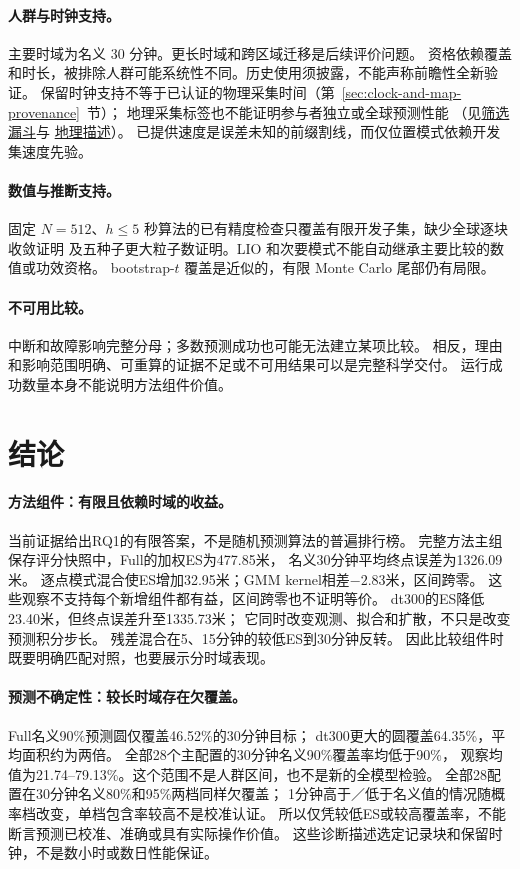 \documentclass[UTF8,11pt]{ctexart}
\begin{document}
\paragraph{人群与时钟支持。}
主要时域为名义 30 分钟。更长时域和跨区域迁移是后续评价问题。
资格依赖覆盖和时长，被排除人群可能系统性不同。历史使用须披露，不能声称前瞻性全新验证。
保留时钟支持不等于已认证的物理采集时间（第~\ref{sec:clock-and-map-provenance}~节）；
地理采集标签也不能证明参与者独立或全球预测性能
（见\hyperref[sec:final-cohort-funnel]{筛选漏斗}与
\hyperref[sec:final-cohort-geography]{地理描述}）。
已提供速度是误差未知的前缀割线，而仅位置模式依赖开发集速度先验。

\paragraph{数值与推断支持。}
固定 \(N=512\)、\(h\le5\) 秒算法的已有精度检查只覆盖有限开发子集，缺少全球逐块收敛证明
及五种子更大粒子数证明。LIO 和次要模式不能自动继承主要比较的数值或功效资格。
bootstrap-\(t\) 覆盖是近似的，有限 Monte Carlo 尾部仍有局限。

\paragraph{不可用比较。}
中断和故障影响完整分母；多数预测成功也可能无法建立某项比较。
相反，理由和影响范围明确、可重算的证据不足或不可用结果可以是完整科学交付。
运行成功数量本身不能说明方法组件价值。

\section{结论}
\paragraph{方法组件：有限且依赖时域的收益。}
当前证据给出RQ1的有限答案，不是随机预测算法的普遍排行榜。
完整方法主组保存评分快照中，Full的加权ES为477.85米，
名义30分钟平均终点误差为1326.09米。
逐点模式混合使ES增加32.95米；GMM kernel相差$-2.83$米，区间跨零。
这些观察不支持每个新增组件都有益，区间跨零也不证明等价。
dt300的ES降低23.40米，但终点误差升至1335.73米；
它同时改变观测、拟合和扩散，不只是改变预测积分步长。
残差混合在5、15分钟的较低ES到30分钟反转。
因此比较组件时既要明确匹配对照，也要展示分时域表现。

\paragraph{预测不确定性：较长时域存在欠覆盖。}
Full名义90\%预测圆仅覆盖46.52\%的30分钟目标；
dt300更大的圆覆盖64.35\%，平均面积约为两倍。
全部28个主配置的30分钟名义90\%覆盖率均低于90\%，
观察均值为21.74--79.13\%。这个范围不是人群区间，也不是新的全模型检验。
全部28配置在30分钟名义80\%和95\%两档同样欠覆盖；
1分钟高于／低于名义值的情况随概率档改变，单档包含率较高不是校准认证。
所以仅凭较低ES或较高覆盖率，不能断言预测已校准、准确或具有实际操作价值。
这些诊断描述选定记录块和保留时钟，不是数小时或数日性能保证。
\end{document}

